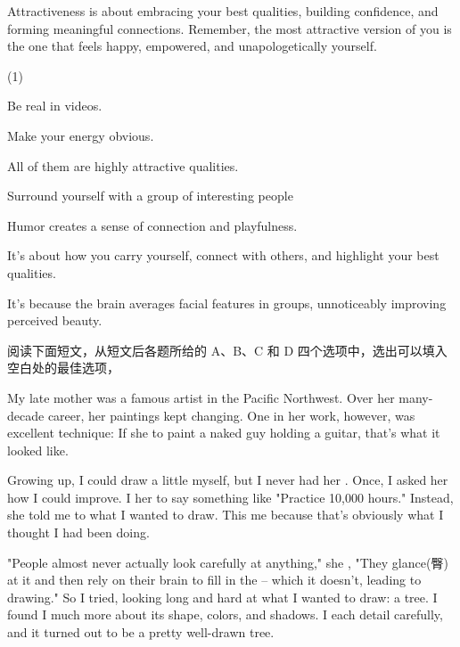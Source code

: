 \documentclass{英语试卷}
\begin{document}
\par Attractiveness is about embracing your best qualities, building confidence, and forming meaningful connections. Remember, the most attractive version of you is the one that feels happy, empowered, and unapologetically yourself.\par
\begin{choices}(1)
  \item Be real in videos.
  \item Make your energy obvious.
  \item All of them are highly attractive qualities.
  \item Surround yourself with a group of interesting people
  \item Humor creates a sense of connection and playfulness.
  \item It's about how you carry yourself, connect with others, and highlight your best qualities.
  \item It's because the brain averages facial features in groups, unnoticeably improving perceived beauty.
\end{choices}
\par 阅读下面短文，从短文后各题所给的 A、B、C 和 D 四个选项中，选出可以填入空白处的最佳选项，\par
\par My late mother was a famous artist in the Pacific Northwest. Over her many-decade career, her paintings kept changing. One  in her work, however, was excellent technique: If she  to paint a naked guy holding a guitar, that's  what it looked like.\par
\par Growing up, I could draw a little myself, but I never had her . Once, I asked her how I could improve. I  her to say something like "Practice 10,000 hours." Instead, she told me to  what I wanted to draw. This  me because that's obviously what I thought I had been doing.\par
\par "People almost never actually look carefully at anything," she , "They glance(臀) at it and then rely on their brain to fill in the  – which it doesn’t, leading to  drawing." So I tried, looking long and hard at what I wanted to draw: a tree. I found I  much more about its shape, colors, and shadows. I  each detail carefully, and it turned out to be a pretty well-drawn tree.\par
\end{document}
